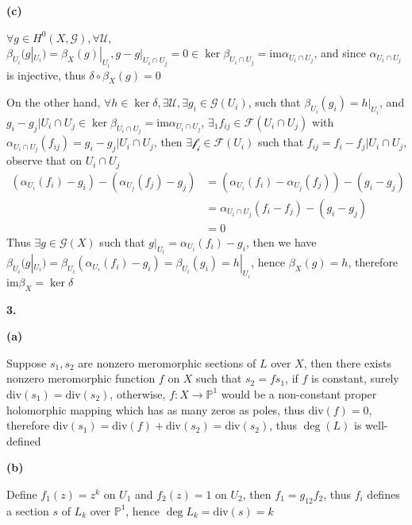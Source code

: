 \documentclass[12pt]{article}
\begin{document}
\textbf{(c)} \par
$\forall g\in H^{0}(X,\mathcal{G}), \forall \mathcal{U}$, $\beta_{U_{i}}(g|_{U_{i}})=\beta_{X}(g)|_{U_{i}},g-g|_{U_{i}\cap U_{j}}=0\in \ker\beta_{U_{i}\cap U_{j}}=\mathrm{im}\alpha_{U_{i}\cap U_{j}}$, and since $\alpha_{U_{i}\cap U_{j}}$ is injective, thus $\delta\circ\beta_{X}(g)=0$ \par
On the other hand, $\forall h\in \ker\delta, \exists\mathcal{U}, \exists g_{i}\in \mathcal{G}(U_{i})$, such that $\beta_{U_{i}}(g_{i})=h|_{U_{i}}$, and $g_{i}-g_{j}|U_{i}\cap U_{j}\in\ker\beta_{U_{i}\cap U_{j}}=\mathrm{im}\alpha_{U_{i}\cap U_{j}}$, $\exists_{1}f_{ij}\in\mathcal{F}(U_{i}\cap U_{j})$ with $\alpha_{U_{i}\cap U_{j}}(f_{ij})=g_{i}-g_{j}|U_{i}\cap U_{j}$, then $\exists\mathcal{f_{i}}\in\mathcal{F}(U_{i})$ such that $f_{ij}=f_{i}-f_{j}|U_{i}\cap U_{j}$, observe that on $U_{i}\cap U_{j}$
\[
\begin{aligned}
\left(\alpha_{U_{i}}(f_{i})-g_{i}\right)-\left(\alpha_{U_{j}}(f_{j})-g_{j}\right)
&=\left(\alpha_{U_{i}}(f_{i})-\alpha_{U_{j}}(f_{j})\right)-\left(g_{i}-g_{j}\right) \\
&=\alpha_{U_{i}\cap U_{j}}(f_{i}-f_{j})-\left(g_{i}-g_{j}\right) \\
&=0
\end{aligned}
\]
Thus $\exists g\in \mathcal{G}(X)$ such that $g|_{U_{i}}=\alpha_{U_{i}}(f_{i})-g_{i}$, then we have $\beta_{U_{i}}(g|_{U_{i}})=\beta_{U_{i}}(\alpha_{U_{i}}(f_{i})-g_{i})=\beta_{U_{i}}(g_{i})=h|_{U_{i}}$, hence $\beta_{X}(g)=h$, therefore $\mathrm{im}\beta_{X}=\ker\delta$ \par
\textbf{3.} \par
\textbf{(a)} \par
Suppose $s_{1},s_{2}$ are nonzero meromorphic sections of $L$ over $X$, then there exists nonzero meromorphic function $f$ on $X$ such that $s_{2}=fs_{1}$, if $f$ is constant, surely $\mathrm{div}(s_{1})=\mathrm{div}(s_{2})$, otherwise, $f: X\rightarrow\mathbb{P}^{1}$ would be a non-constant proper holomorphic mapping which has as many zeros as poles, thus $\mathrm{div}(f)=0$, therefore $\mathrm{div}(s_{1})=\mathrm{div}(f)+\mathrm{div}(s_{2})=\mathrm{div}(s_{2})$, thus $\deg (L)$ is well-defined \par
\textbf{(b)} \par
Define $f_{1}(z)=z^{k}$ on $U_{1}$ and $f_{2}(z)=1$ on $U_{2}$, then $f_{1}=g_{12}f_{2}$, thus $f_{i}$ defines a section $s$ of $L_{k}$ over $\mathbb{P}^{1}$, hence $\deg L_{k}=\mathrm{div}(s)=k$ \par
\end{document}
